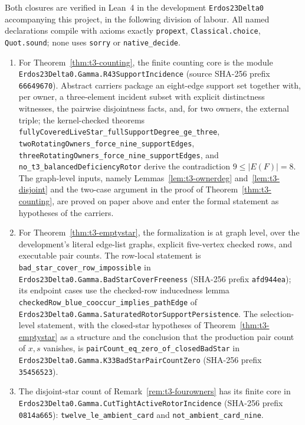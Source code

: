 \begin{remark}[Formalization]\label{rem:t3-lean}
Both closures are verified in Lean~4 in the development
\texttt{Erdos23Delta0} accompanying this project, in the following
division of labour. All named declarations compile with axioms exactly
\texttt{propext}, \texttt{Classical.choice}, \texttt{Quot.sound}; none
uses \texttt{sorry} or \texttt{native\_decide}.
\begin{enumerate}[label=\textup{(\roman*)}]
\item For Theorem~\ref{thm:t3-counting}, the finite counting core is
the module \texttt{Erdos23Delta0.Gamma.R43SupportIncidence} (source
SHA-256 prefix \texttt{66649670}). Abstract carriers package an
eight-edge support set together with, per owner, a three-element
incident subset with explicit distinctness witnesses, the pairwise
disjointness facts, and, for two owners, the external triple; the
kernel-checked theorems
\texttt{fullyCoveredLiveStar\_fullSupportDegree\_ge\_three},
\texttt{twoRotatingOwners\_force\_nine\_supportEdges},
\texttt{threeRotatingOwners\_force\_nine\_supportEdges}, and
\texttt{no\_t3\_balancedDeficiencyRotor} derive the contradiction
\(9\le|E(F)|=8\). The graph-level inputs, namely
Lemmas~\ref{lem:t3-ownerdeg} and~\ref{lem:t3-disjoint} and the
two-case argument in the proof of Theorem~\ref{thm:t3-counting}, are
proved on paper above and enter the formal statement as hypotheses of
the carriers.
\item For Theorem~\ref{thm:t3-emptystar}, the formalization is at
graph level, over the development's literal edge-list graphs, explicit
five-vertex checked rows, and executable pair counts. The row-local
statement is \texttt{bad\_star\_cover\_row\_impossible} in
\texttt{Erdos23Delta0.Gamma.BadStarCoverFreeness} (SHA-256 prefix
\texttt{afd944ea}); its endpoint cases use the checked-row inducedness
lemma \texttt{checkedRow\_blue\_cooccur\_implies\_pathEdge} of
\texttt{Erdos23Delta0.Gamma.SaturatedRotorSupportPersistence}. The
selection-level statement, with the closed-star hypotheses of
Theorem~\ref{thm:t3-emptystar} as a structure and the conclusion that
the production pair count of \(x,s\) vanishes, is
\texttt{pairCount\_eq\_zero\_of\_closedBadStar} in
\texttt{Erdos23Delta0.Gamma.K33BadStarPairCountZero} (SHA-256 prefix
\texttt{35456523}).
\item The disjoint-star count of Remark~\ref{rem:t3-fourowners} has
its finite core in
\texttt{Erdos23Delta0.Gamma.CutTightActiveRotorIncidence} (SHA-256
prefix \texttt{0814a665}): \texttt{twelve\_le\_ambient\_card} and
\texttt{not\_ambient\_card\_nine}.
\end{enumerate}
\end{remark}

